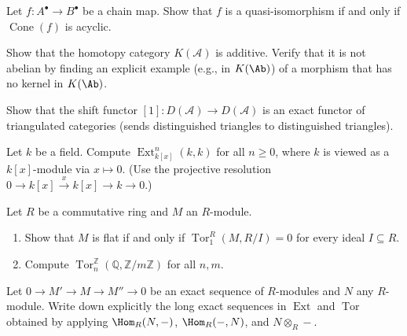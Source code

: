 \begin{exercise}\label{exo:acyclic-cone}
Let $f \colon A^\bullet \to B^\bullet$ be a chain map. Show that $f$ is a quasi-isomorphism
if and only if $\operatorname{Cone}(f)$ is acyclic.
\end{exercise}

\begin{exercise}\label{exo:homotopy-category-additive}
Show that the homotopy category $K(\mathcal{A})$ is additive. Verify that it is not
abelian by finding an explicit example (e.g., in $K(\Ab)$) of a morphism that has no
kernel in $K(\Ab)$.
\end{exercise}

\begin{exercise}\label{exo:shift-exact}
Show that the shift functor $[1] \colon D(\mathcal{A}) \to D(\mathcal{A})$ is an
exact functor of triangulated categories (sends distinguished triangles to
distinguished triangles).
\end{exercise}

\begin{exercise}\label{exo:ext-computation}
Let $k$ be a field. Compute $\operatorname{Ext}^n_{k[x]}(k, k)$ for all $n \geq 0$,
where $k$ is viewed as a $k[x]$-module via $x \mapsto 0$. (Use the projective resolution
$0 \to k[x] \xrightarrow{x} k[x] \to k \to 0$.)
\end{exercise}

\begin{exercise}\label{exo:tor-flat}
Let $R$ be a commutative ring and $M$ an $R$-module.
\begin{enumerate}
    \item Show that $M$ is flat if and only if $\operatorname{Tor}_1^R(M, R/I) = 0$ for
    every ideal $I \subseteq R$.
    \item Compute $\operatorname{Tor}_n^{\mathbb{Z}}(\mathbb{Q}, \mathbb{Z}/m\mathbb{Z})$
    for all $n, m$.
\end{enumerate}
\end{exercise}

\begin{exercise}\label{exo:derived-ses}
Let $0 \to M' \to M \to M'' \to 0$ be an exact sequence of $R$-modules and $N$ any
$R$-module. Write down explicitly the long exact sequences in $\operatorname{Ext}$ and
$\operatorname{Tor}$ obtained by applying $\Hom_R(N, -)$, $\Hom_R(-, N)$, and
$N \otimes_R -$.
\end{exercise}

